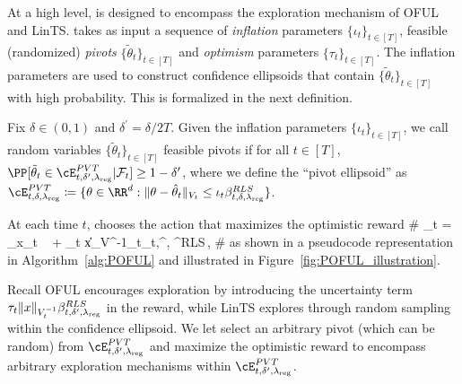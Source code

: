 At a high level, \POFUL{} is designed to encompass the exploration mechanism of OFUL and LinTS. \POFUL{} takes as input a sequence of \emph{inflation} parameters $\{\iota_t\}_{t\in [T]}$,  feasible (randomized) \emph{pivots} $\{\tilde{\theta}_t\}_{t\in[T]}$ and \emph{optimism} parameters $\{\tau_t\}_{t\in [T]}$. The inflation parameters are used to construct confidence ellipsoids that contain $\{\tilde{\theta}_t\}_{t\in[T]}$ with high probability. This is formalized in the next definition.%

\begin{definition} \label{def:tilde_beta}
Fix  $\delta \in (0,1)$ and  $\delta^\prime = \delta/2 T$. Given the inflation parameters $\{\iota_t\}_{t\in [T]}$, we call random variables $\{\tilde{\theta}_t\}_{t\in[T]}$  feasible pivots if for all $t\in[T]$,
%
$
	\PP[\tilde{\theta}_t \in \cE_{t,\delta^\prime, \lambdareg}^{\PVT} |\mathcal{F}_t] \geq 1 - \delta^\prime
$,
% 
where we define the ``pivot ellipsoid'' as
$
 \cE_{t,\delta, \lambdareg}^{\PVT}  \coloneqq  \{\theta \in \RR^d: \|\theta - \hparam_t\|_{V_t}\leq \iota_t \beta^{RLS}_{t,\delta,\lambdareg} \}
$.
\end{definition}

At each time $t$, \POFUL{} chooses the action that maximizes the optimistic reward 
%
\#\label{eq:POFUL}
_t = \argmax_{x\in\cX_t} \    +   \tau_t  \|x\|_{V^{-1}_t}\beta_{t,\delta^\prime, \lambdareg}^{RLS}\,,
\#
%
as shown in a pseudocode representation in Algorithm~\ref{alg:POFUL} and illustrated in Figure~\ref{fig:POFUL_illustration}. 

Recall OFUL encourages exploration by introducing the uncertainty term $\tau_t  \|x\|_{V^{-1}_t}\beta_{t,\delta^\prime, \lambda_{\text{reg}}}^{RLS}$ in the reward, while LinTS explores through random sampling within the confidence ellipsoid. We let \POFUL{} select an arbitrary pivot (which can be random) from $\cE_{t,\delta^\prime, \lambdareg}^{\PVT}$ and maximize the optimistic reward to encompass arbitrary exploration mechanisms within $\cE_{t,\delta^\prime, \lambdareg}^{\PVT}$. 


